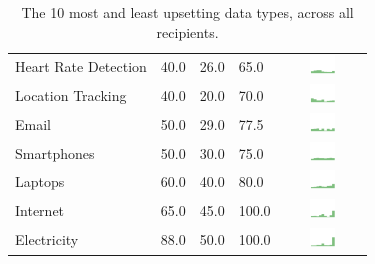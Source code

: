 \begin{table}[t]
\begin{center}
\begin{tabular}{| p{2cm} | p{1cm} | p{1cm} | p{1cm} | c |}
Heart Rate Detection & 40.0 & 26.0 & 65.0 & \includegraphics[width = 2cm, height = 0.5cm]{tex-inputs/table-images/heartratedetectionben} \\ 
Location Tracking & 40.0 & 20.0 & 70.0 & \includegraphics[width = 2cm, height = 0.5cm]{tex-inputs/table-images/locationtrackingben} \\ 
Email & 50.0 & 29.0 & 77.5 & \includegraphics[width = 2cm, height = 0.5cm]{tex-inputs/table-images/emailben} \\ 
Smartphones & 50.0 & 30.0 & 75.0 & \includegraphics[width = 2cm, height = 0.5cm]{tex-inputs/table-images/smartphonesben} \\ 
Laptops & 60.0 & 40.0 & 80.0 & \includegraphics[width = 2cm, height = 0.5cm]{tex-inputs/table-images/laptopsben} \\ 
Internet & 65.0 & 45.0 & 100.0 & \includegraphics[width = 2cm, height = 0.5cm]{tex-inputs/table-images/internetben} \\ 
Electricity & 88.0 & 50.0 & 100.0 & \includegraphics[width = 2cm, height = 0.5cm]{tex-inputs/table-images/ElectricityBenefit} \\ 
\hline
\end{tabular}
\caption{The 10 most and least upsetting data types, across all recipients.}
\label{top10}
\end{center}
\end{table}
